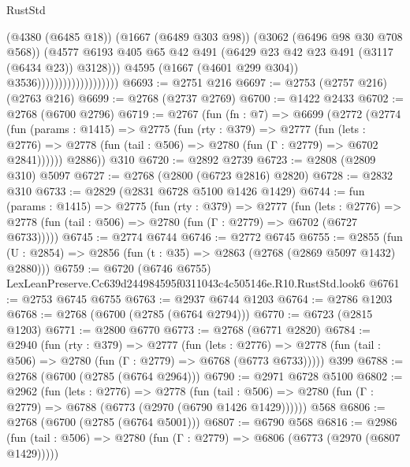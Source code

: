\begin{lexlean}{RustStd}
\begin{coremodule}
                                            (@4380 (@6485 @18))
                                            (@1667 (@6489 @303 @98))
                                            (@3062 (@6496 @98 @30 @708 @568))
                                            (@4577
                                              @6193
                                              @405
                                              @65
                                              @42
                                              @491
                                              (@6429 @23 @42 @23 @491 (@3117 (@6434 @23)) @3128)))
                                          @4595
                                          (@1667 (@4601 @299 @304))
                                          @3536)))))))))))))))))))
@6693 := @2751 @216
@6697 := @2753 (@2757 @216) (@2763 @216)
@6699 := @2768 (@2737 @2769)
@6700 := @1422 @2433
@6702 := @2768 (@6700 @2796)
@6719 := @2767
    (fun (fn : @7) =>
    @6699
      (@2772
        (@2774
          (fun (params : @1415) =>
          @2775
            (fun (rty : @379) =>
            @2777
              (fun (lets : @2776) =>
              @2778 (fun (tail : @506) => @2780 (fun (Γ : @2779) => @6702 @2841))))))
        @2886))
    @310
@6720 := @2892 @2739
@6723 := @2808 (@2809 @310) @5097
@6727 := @2768 (@2800 (@6723 @2816) @2820)
@6728 := @2832 @310
@6733 := @2829 (@2831 @6728 @5100 @1426 @1429)
@6744 := fun (params : @1415) =>
  @2775
    (fun (rty : @379) =>
    @2777
      (fun (lets : @2776) =>
      @2778 (fun (tail : @506) => @2780 (fun (Γ : @2779) => @6702 (@6727 @6733)))))
@6745 := @2774 @6744
@6746 := @2772 @6745
@6755 := @2855 (fun (U : @2854) => @2856 (fun (t : @35) => @2863 (@2768 (@2869 @5097 @1432) @2880)))
@6759 := @6720 (@6746 @6755) LexLeanPreserve.Cc639d244984595f0311043c4c505146e.R10.RustStd.look6
@6761 := @2753 @6745 @6755
@6763 := @2937 @6744 @1203
@6764 := @2786 @1203
@6768 := @2768 (@6700 (@2785 (@6764 @2794)))
@6770 := @6723 (@2815 @1203)
@6771 := @2800 @6770
@6773 := @2768 (@6771 @2820)
@6784 := @2940
    (fun (rty : @379) =>
    @2777
      (fun (lets : @2776) =>
      @2778 (fun (tail : @506) => @2780 (fun (Γ : @2779) => @6768 (@6773 @6733)))))
    @399
@6788 := @2768 (@6700 (@2785 (@6764 @2964)))
@6790 := @2971 @6728 @5100
@6802 := @2962
    (fun (lets : @2776) =>
    @2778
      (fun (tail : @506) => @2780 (fun (Γ : @2779) => @6788 (@6773 (@2970 (@6790 @1426 @1429))))))
    @568
@6806 := @2768 (@6700 (@2785 (@6764 @5001)))
@6807 := @6790 @568
@6816 := @2986
    (fun (tail : @506) => @2780 (fun (Γ : @2779) => @6806 (@6773 (@2970 (@6807 @1429)))))

\end{coremodule}
\end{lexlean}
